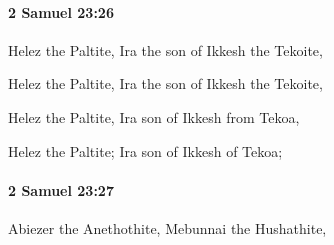 		\paragraph{2 Samuel 23:26} %
			\label{2SAMUEL-23-26}

			Helez the Paltite, Ira the son of Ikkesh the Tekoite,

			\begin{versebox}
					\item[BHS] 
					\item[ASV] Helez the Paltite, Ira the son of Ikkesh the Tekoite,
					\item[NIV] Helez the Paltite, Ira son of Ikkesh from Tekoa,
					\item[NRSV] Helez the Paltite; Ira son of Ikkesh of Tekoa;
			\end{versebox}

		\paragraph{2 Samuel 23:27} %
			\label{2SAMUEL-23-27}

			Abiezer the Anethothite, Mebunnai the Hushathite,

